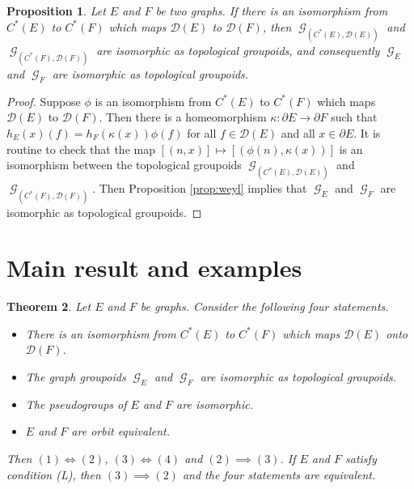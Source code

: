\documentclass[12pt, a4paper]{amsart}
\numberwithin{equation}{section}
\newtheorem{thm}{Theorem}[section]
\newtheorem{prop}[thm]{Proposition}
\theoremstyle{definition}
\theoremstyle{remark}
\begin{document}
\begin{prop}\label{prop:groupoid-iso}
	Let $E$ and $F$ be two graphs. If there is an isomorphism from $C^*(E)$ to 
	$C^*(F)$ which maps $\mathcal{D}(E)$ to $\mathcal{D}(F)$, then 
	${\operatorname{\mathcal{G}}}_{(C^*(E),\mathcal{D}(E))}$ and ${\operatorname{\mathcal{G}}}_{(C^*(F),\mathcal{D}(F))}$ are isomorphic as topological groupoids, and 
	consequently ${\operatorname{\mathcal{G}}}_E$ and ${\operatorname{\mathcal{G}}}_F$ are isomorphic as topological groupoids.
\end{prop}

\begin{proof}
	Suppose $\phi$ is an isomorphism from $C^*(E)$ to $C^*(F)$ which maps 
	$\mathcal{D}(E)$ to $\mathcal{D}(F)$. Then there is a homeomorphism 
	$\kappa:\partial E\to\partial F$ such that 
	$h_E(x)(f)=h_F(\kappa(x))\phi(f)$ for all $f\in\mathcal{D}(E)$ and all 
	$x\in\partial E$. It is routine to check that the map 
	$[(n,x)]\mapsto [(\phi(n),\kappa(x))]$ is an isomorphism between the 
	topological groupoids ${\operatorname{\mathcal{G}}}_{(C^*(E),\mathcal{D}(E))}$ and 
	${\operatorname{\mathcal{G}}}_{(C^*(F),\mathcal{D}(F))}$. Then Proposition 
	\ref{prop:weyl} implies that ${\operatorname{\mathcal{G}}}_E$ and ${\operatorname{\mathcal{G}}}_F$ are isomorphic as 
	topological groupoids.
\end{proof}

\section{Main result and examples}\label{sec: Statement of the main result}

\begin{thm}\label{thm: the main thm}
Let $E$ and $F$ be graphs. Consider the following four statements. 
\begin{itemize}
\item[(1)] There is an isomorphism from $C^*(E)$ to $C^*(F)$ which maps $\mathcal{D}(E)$ onto $\mathcal{D}(F)$.
\item[(2)] The graph groupoids ${\operatorname{\mathcal{G}}}_E$ and ${\operatorname{\mathcal{G}}}_F$ are isomorphic as topological groupoids.
\item[(3)] The pseudogroups of $E$ and $F$ are isomorphic.
\item[(4)] $E$ and $F$ are orbit equivalent.
\end{itemize}
Then $(1)\iff (2)$, $(3)\iff (4)$ and $(2)\implies (3)$. If $E$ and $F$ 
satisfy condition (L), then $(3)\implies (2)$ and the four statements are 
equivalent.
\end{thm}
\end{document}
